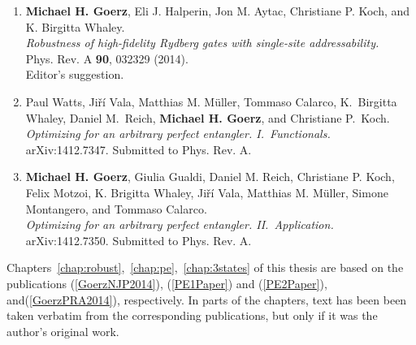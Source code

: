\begin{enumerate}
  \item
  {\bf Michael H. Goerz}, Eli J. Halperin, Jon M. Aytac, Christiane P. Koch, and K.  Birgitta Whaley. \\
  {\it Robustness of high-fidelity Rydberg gates with single-site addressability.} \\
  Phys. Rev. A {\bf 90}, 032329 (2014). \\
  Editor's suggestion.
  \label{GoerzPRA2014}

  \item
  Paul Watts, Ji\v{r}\'i Vala, Matthias M. M\"uller, Tommaso Calarco, K.\ Birgitta Whaley, Daniel M.\ Reich, {\bf Michael H. Goerz}, and Christiane P.\ Koch. \\
  {\it Optimizing for an arbitrary perfect entangler. I.~Functionals.} \\
  arXiv:1412.7347. Submitted to Phys. Rev. A.
  \label{PE1Paper}

  \item
  {\bf Michael H. Goerz}, Giulia Gualdi, Daniel M. Reich, Christiane P. Koch, Felix Motzoi, K. Brigitta Whaley, Ji\v{r}\'i Vala, Matthias M. M\"uller, Simone Montangero, and Tommaso Calarco. \\
  {\it Optimizing for an arbitrary perfect entangler. II.~Application.} \\
  arXiv:1412.7350. Submitted to Phys. Rev. A.
  \label{PE2Paper}

\end{enumerate}

\noindent
Chapters~\ref{chap:robust},~\ref{chap:pe},~\ref{chap:3states} of this thesis are
based on the publications (\ref{GoerzNJP2014}), (\ref{PE1Paper}) and
(\ref{PE2Paper}), and(\ref{GoerzPRA2014}), respectively.
In parts of the chapters, text has been been taken verbatim from the
corresponding publications, but only if it was the author's
original work.
